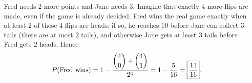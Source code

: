Fred needs $2$ more points and Jane needs $3$. Imagine that exactly $4$ more flips are made, even if the game is already decided. Fred wins the real game exactly when at least $2$ of these $4$ flips are heads: if so, he reaches $10$ before Jane can collect $3$ tails (there are at most $2$ tails), and otherwise Jane gets at least $3$ tails before Fred gets $2$ heads. Hence
\[
P(\text{Fred wins})=1-\dfrac{\dbinom40+\dbinom41}{2^4}=1-\dfrac{5}{16}=\boxed{\dfrac{11}{16}}.
\]
